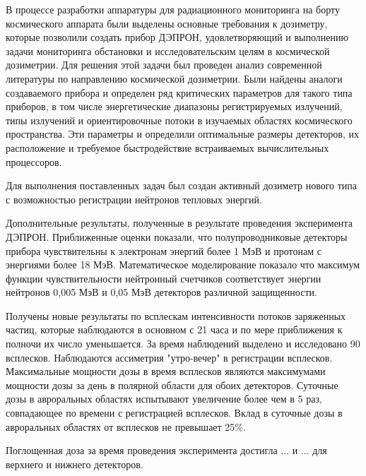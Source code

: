 
В процессе разработки аппаратуры для радиационного мониторинга на борту космического аппарата были выделены основные требования к дозиметру, которые позволили создать прибор ДЭПРОН, удовлетворяющий и выполнению задачи мониторинга обстановки и исследовательским целям в космической дозиметрии. Для решения этой задачи был проведен анализ современной литературы по направлению космической дозиметрии. Были найдены аналоги создаваемого прибора и определен ряд критических параметров для такого типа приборов, в том числе энергетические диапазоны регистрируемых излучений, типы излучений и ориентировочные потоки в изучаемых областях космического пространства. Эти параметры и определили оптимальные размеры детекторов, их расположение и требуемое быстродействие встраиваемых вычислительных процессоров.

Для выполнения поставленных задач был создан активный дозиметр нового типа с возможностью регистрации нейтронов тепловых энергий.

Дополнительные результаты, полученные в результате проведения эксперимента ДЭПРОН.  Приближенные оценки показали, что полупроводниковые детекторы прибора чувствительны к электронам энергий более 1 МэВ и протонам с энергиями более 18 МэВ. Математическое моделирование показало что максимум функции чувствительности нейтронный счетчиков соответствует энергии нейтронов 0,005 МэВ и 0,05 МэВ детекторов различной защищенности.

Получены новые результаты по всплескам интенсивности потоков заряженных частиц, которые  наблюдаются в основном с 21 часа и по мере приближения к полночи их число уменьшается. За время наблюдений выделено и исследовано 90 всплесков. Наблюдаются ассиметрия "утро-вечер" в регистрации всплесков. Максимальные мощности дозы в время всплесков являются максимумами мощности дозы за день в полярной области для обоих детекторов. Суточные дозы в авроральных областях испытывают увеличение более чем в 5 раз, совпадающее по времени с регистрацией всплесков.  Вклад в суточные дозы в авроральных областях от всплесков не превышает 25\%.

Поглощенная доза за время проведения эксперимента достигла ... и ... для верхнего и нижнего детекторов.


